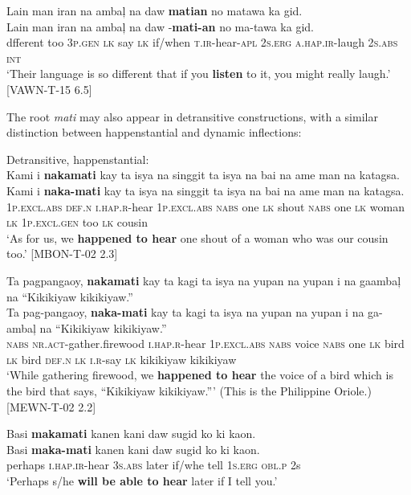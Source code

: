 \ea
\label{bkm:Ref121468843}
Lain  man  iran  na  ambaļ  na  daw  \textbf{matian}   no  matawa  ka  gid. \\\smallskip
\gll Lain  man  iran  na  ambaļ  na  daw  \emptyset{}-\textbf{mati-an}   no  ma-tawa  ka  gid. \\
dfferent  too  3\textsc{p.gen}  \textsc{lk}  say  \textsc{lk}  if/when  \textsc{t.ir}-hear-\textsc{apl} 2\textsc{s.erg}  \textsc{a.hap.ir}-laugh  2\textsc{s.abs}  \textsc{int} \\
\glt ‘Their language is so different that if you \textbf{listen} to it, you might really laugh.’ [VAWN-T-15 6.5]
\z

The root \textit{mati} may also appear in detransitive constructions, with a similar distinction between happenstantial and dynamic inflections:

\ea
Detransitive, happenstantial: \\
Kami  i  \textbf{nakamati}  kay  ta  isya  na  singgit   ta  isya  na  bai  na  ame  man  na  katagsa. \\\smallskip
\gll Kami  i  \textbf{naka-mati}  kay  ta  isya  na  singgit   ta  isya  na  bai  na  ame  man  na  katagsa. \\
1\textsc{p.excl.abs}  \textsc{def.n}  \textsc{i.hap.r}-hear  1\textsc{p.excl.abs}  \textsc{nabs}  one  \textsc{lk}  shout \textsc{nabs}  one  \textsc{lk}  woman  \textsc{lk}  1\textsc{p.excl.gen}  too  \textsc{lk}  cousin \\
\glt `As for us, we \textbf{happened to hear} one shout of a woman who was our cousin too.’ [MBON-T-02 2.3]
\z

\ea
Ta  pagpangaoy,  \textbf{nakamati}  kay  ta  kagi  ta   isya  na  yupan  na  yupan  i  na  gaambaļ  na  “Kikikiyaw  kikikiyaw.” \\\smallskip
\gll Ta  pag-pangaoy,  \textbf{naka-mati}  kay  ta  kagi  ta   isya  na  yupan  na  yupan  i  na  ga-ambaļ  na  “Kikikiyaw  kikikiyaw.” \\
\textsc{nabs}  \textsc{nr.act}-gather.firewood  \textsc{i.hap.r}-hear  1\textsc{p.excl.abs}  \textsc{nabs}  voice  \textsc{nabs} one  \textsc{lk}  bird  \textsc{lk}  bird  \textsc{def.n}  \textsc{lk}  \textsc{i.r}-say  \textsc{lk}  kikikiyaw  kikikiyaw \\
\glt `While gathering firewood, we \textbf{happened to hear} the voice of a bird which is the bird that says, “Kikikiyaw kikikiyaw.”' (This is the Philippine Oriole.) [MEWN-T-02 2.2]
\z

\ea
Basi  \textbf{makamati}  kanen  kani  daw  sugid  ko  ki  kaon. \\\smallskip
\gll Basi  \textbf{maka-mati}  kanen  kani  daw  sugid  ko  ki  kaon. \\
perhaps  \textsc{i.hap.ir}-hear  3\textsc{s.abs}  later  if/whe  tell  1\textsc{s.erg}  \textsc{obl.p}  2s \\
\glt ‘Perhaps s/he \textbf{will be able to hear} later if I tell you.’
\z

